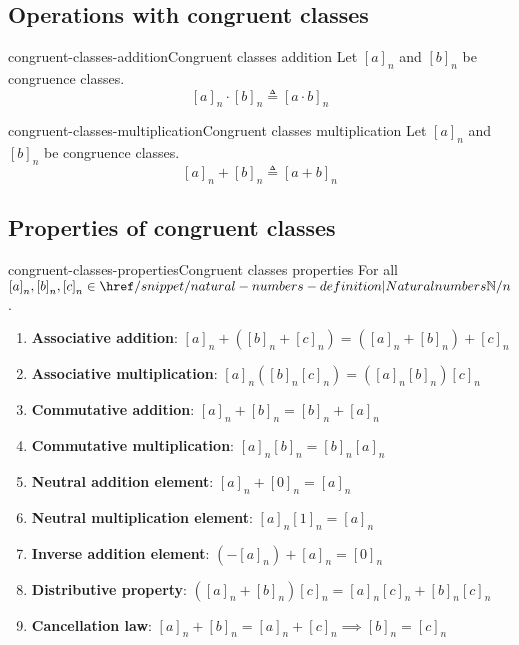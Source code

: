 \documentclass[preview]{standalone}
\begin{document}
\subsection{Operations with congruent classes}

\begin{snippetdefinition}{congruent-classes-addition}{Congruent classes addition}
    Let \({[a]}_n\) and \({[b]}_n\) be congruence classes.  
    \[{[a]}_n \cdot {[b]}_n \triangleq {[a \cdot b]}_n\]
\end{snippetdefinition}

\begin{snippetdefinition}{congruent-classes-multiplication}{Congruent classes multiplication}
    Let \({[a]}_n\) and \({[b]}_n\) be congruence classes.  
    \[{[a]}_n + {[b]}_n \triangleq {[a + b]}_n\]
\end{snippetdefinition}

\subsection{Properties of congruent classes}

\begin{snippetproposition}{congruent-classes-properties}{Congruent classes properties}    
    For all \({[a]}_n, {[b]}_n, {[c]}_n \in \naturalnumbers/n\).

    \begin{enumerate}
        \item \textbf{Associative addition}: \({[a]}_n + ({[b]}_n + {[c]}_n) = ({[a]}_n + {[b]}_n) + {[c]}_n\)
        \item \textbf{Associative multiplication}: \({[a]}_n ({[b]}_n {[c]}_n) = ({[a]}_n {[b]}_n) {[c]}_n\)
        \item \textbf{Commutative addition}: \({[a]}_n + {[b]}_n = {[b]}_n + {[a]}_n\)
        \item \textbf{Commutative multiplication}: \({[a]}_n {[b]}_n = {[b]}_n {[a]}_n\)
        \item \textbf{Neutral addition element}: \({[a]}_n + {[0]}_n = {[a]}_n\)
        \item \textbf{Neutral multiplication element}: \({[a]}_n {[1]}_n = {[a]}_n\)
        \item \textbf{Inverse addition element}: \((-{[a]}_n) + {[a]}_n = {[0]}_n\)
        \item \textbf{Distributive property}: \(({[a]}_n + {[b]}_n) {[c]}_n = {[a]}_n{[c]}_n + {[b]}_n{[c]}_n\)
        \item \textbf{Cancellation law}: \({[a]}_n + {[b]}_n = {[a]}_n + {[c]}_n \implies {[b]}_n = {[c]}_n\)
    \end{enumerate}
\end{snippetproposition}
\end{document}
